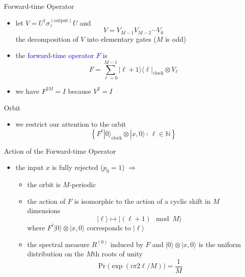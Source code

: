 \documentclass[slideColor]{prosper}
\newcommand{\N}{{\mathbb{N}}}
\renewcommand{\>}{\rangle}
\newcommand{\<}{\langle}
\begin{document}

\begin{slide}{Forward-time Operator}

\begin{itemize}
\item let $V = U^\dagger \sigma_z^{(\textrm{output})} U$ and
\[
V = V_{M-1} V_{M-2} \cdots V_0
\]
the decomposition of $V$ into elementary gates ($M$ is odd)

\medskip
\item the \textcolor{blue}{forward-time operator $F$} is
\[
F = \sum_{\ell=0}^{M-1} |\ell+1\>\<\ell|_{\mathrm{clock}} \otimes V_\ell
\]

\medskip
\item we have $F^{2M}=I$ because $V^2=I$
\end{itemize}

\end{slide}


\begin{slide}{Orbit}

\begin{itemize}
\item we restrict our attention to the orbit
\[
\left\{
F^\ell |0\>_{\mathrm{clock}} \otimes |x,0\> \, : \, \ell\in\N
\right\}
\]

\end{itemize}

\end{slide}


\begin{slide}{Action of the Forward-time Operator}

\begin{itemize}
\item the input $x$ is fully rejected ($p_0=1$) $\Rightarrow$

\begin{itemize}
\item the orbit is $M$-periodic 

\medskip
\item the action of $F$ is isomorphic to the action of a cyclic shift in $M$ dimensions
\[
|\ell\> \mapsto |(\ell + 1) \mod M \>
\]
where $F^\ell |0\>\otimes |x,0\>$ corresponds to $|\ell\>$

\medskip
\item the spectral measure $R^{(0)}$ induced by $F$ and $|0\>\otimes|x,0\>$ is 
the uniform distribution on the $M$th roots of unity
\[
\Pr\big(\exp(i\pi 2\ell/M)\big) = \frac{1}{M} 
\]

\end{itemize}
\end{itemize}

\end{slide}
\end{document}
